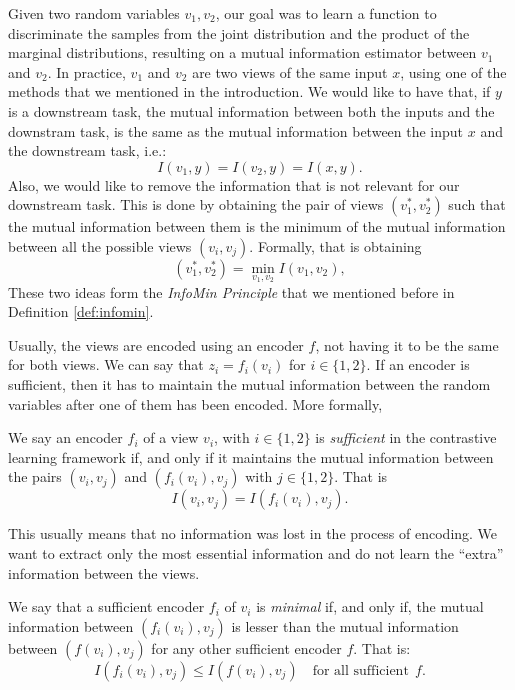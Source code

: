 Given two random variables $v_1,v_2$, our goal was to learn a function to discriminate the samples from the joint distribution and the product of the marginal distributions, resulting on a mutual information estimator between $v_1$ and $v_2$. In practice, $v_1$ and $v_2$ are two views of the same input $x$, using one of the methods that we mentioned in the introduction. We would like to have that, if $y$ is a downstream task, the mutual information between both the inputs and the downstram task, is the same as the mutual information between the input $x$ and the downstream task, i.e.:
\[
I(v_1,y) = I(v_2,y) = I(x,y).  
\]
Also, we would like to remove the information that is not relevant for our downstream task. This is done by obtaining the pair of views $(v_1^*,v_2^*)$ such that the mutual information between them is the minimum of the mutual information between all the possible views $(v_i,v_j)$. Formally, that is obtaining
\[
(v_1^*, v_2^*) = \min_{v_1,v_2} I (v_1,v_2),    
\]
These two ideas form the \emph{InfoMin Principle} that we mentioned before in Definition \ref{def:infomin}.

Usually, the views are encoded using an encoder $f$, not having it to be the same for both views. We can say that $z_i = f_i(v_i)$ for $i \in \{1,2\}$. If an encoder is sufficient, then it has to maintain the mutual information between the random variables after one of them has been encoded. More formally,

\begin{ndef}
We say an encoder $f_i$ of a view $v_i$, with $i \in \{1,2\}$ is \emph{sufficient} in the contrastive learning framework if, and only if it maintains the mutual information between the pairs $(v_i,v_j)$ and $(f_i(v_i),v_j)$ with $j \in \{1,2\}$. That is
\[
I(v_i,v_j) = I(f_i(v_i),v_j).    
\]
\end{ndef}
This usually means that no information was lost in the process of encoding. We want to extract only the most essential information and do not learn the ``extra'' information between the views.
\begin{ndef}
We say that a sufficient encoder $f_i$ of $v_i$ is \emph{minimal} if, and only if, the mutual information between $(f_i(v_i),v_j)$ is lesser than the mutual information between $(f(v_i),v_j)$ for any other sufficient encoder $f$. That is:
\[
I(f_i(v_i),v_j) \leq I(f(v_i),v_j) \quad \text{for all sufficient}\ \ f. 
\]
\end{ndef}

